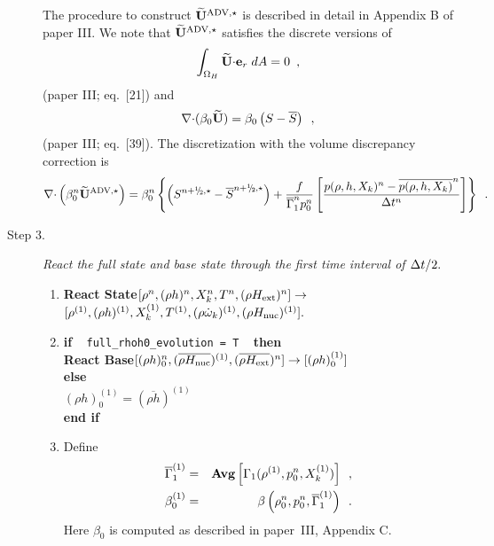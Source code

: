 \begin{description}
The procedure to construct $\widetilde{\mathbf{U}}^{\mathrm{ADV},\star}$ is described in detail in Appendix B of paper III.
We note that  $\widetilde{\mathbf{U}}^{\mathrm{ADV},\star}$ satisfies the discrete versions of 
\begin{equation}
\int_{\Omega_H} \widetilde{{\bf U}} \mathbf{\cdot} \mathbf{e}_r \; dA = 0 \label{eq:udoterzero} \enskip ,
\end{equation}
(paper III; eq.~[21])
and
\begin{equation}
\mathbf{\nabla} \mathbf{\cdot} (\beta_0 \widetilde{{\bf U}} )  = \beta_0 \left(S - \overline{S} \right )\enskip ,
\label{eq:tildeconstraint}
\end{equation}
(paper III; eq.~[39]).  The discretization with the volume discrepancy correction is
\begin{equation}
\nablab \cdotb \left(\beta_0^n \uadvone\right) = 
\beta_0^n \left\{ \left(S^{\nph,\star} - \overline{S}^{\nph,\star}\right)
+ \frac{f}{\gammabar^n p_0^n}
\left[\frac{p(\rho,h,X_k)^n - \overline{p(\rho,h,X_k)}^n}{\Delta t^n}\right]\right\} \enskip .
\end{equation}

\item[Step 3.] {\em React the full state and base state through the first time 
interval of $\Delta t / 2.$}


\begin{enumerate}
\renewcommand{\theenumi}{{\bf \alph{enumi}}}

\item {\bf React State}$[\rho^n, (\rho h)^n, X_k^n, T^n, (\rho{H_{\rm ext}})^n]
                   \rightarrow$ $[ \rho^{(1)}, (\rho h)^{(1)}, X_k^{(1)}, T^{(1)},
                                  (\rho \dot{\omega}_k)^{(1)}, (\rho {H_{\rm nuc}})^{(1)} ].$  

\item {\bf if} ~ {\tt full\_rhoh0\_evolution = T} ~ {\bf then}\\
{\bf React Base}$[(\rho h)_0^n,(\overline{\rho {H_{\rm nuc}}})^{(1)},(\overline{\rho{H_{\rm ext}}})^n] \rightarrow [(\rho h)_0^{(1)}]$ \\
{\bf else}\\
$(\rho h)_0^{(1)} = (\overline{\rho h})^{(1)}$\\
{\bf end if}
\item
Define
\begin{eqnarray}
\overline{\Gamma}_1^{(1)}        &=& {\rm{\bf Avg}} \left[ \Gamma_1(\rho^{(1)}, p_0^{n}, X_k^{(1)}) \right] \enskip , \\
 {\beta   }_0^{(1)}    &=& \beta   \left(\rho_0^{n}, p_0^{n}, \overline{\Gamma}_1^{(1)}\right) \enskip .
\end{eqnarray}
Here $\beta_0$ is computed as described in paper~III, Appendix C.


\end{enumerate}
\end{description}
